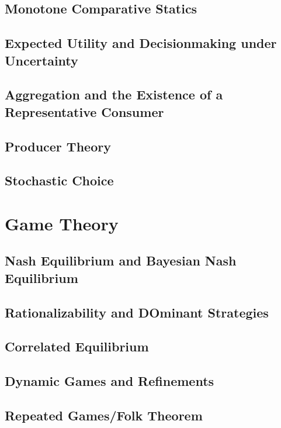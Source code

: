 \documentclass[12pt,openany]{report}
\theoremstyle{indented}
\numberwithin{definition}{section}
\numberwithin{theorem}{section}
\numberwithin{example}{section}
\begin{document}
\chapter{Monotone Comparative Statics}

\chapter{Expected Utility and Decisionmaking under Uncertainty}

\chapter{Aggregation and the Existence of a Representative Consumer}

\chapter{Producer Theory}

\chapter{Stochastic Choice}

\part{Game Theory}

\chapter{Nash Equilibrium and Bayesian Nash Equilibrium}

\chapter{Rationalizability and DOminant Strategies}

\chapter{Correlated Equilibrium}

\chapter{Dynamic Games and Refinements}

\chapter{Repeated Games/Folk Theorem}
\end{document}
